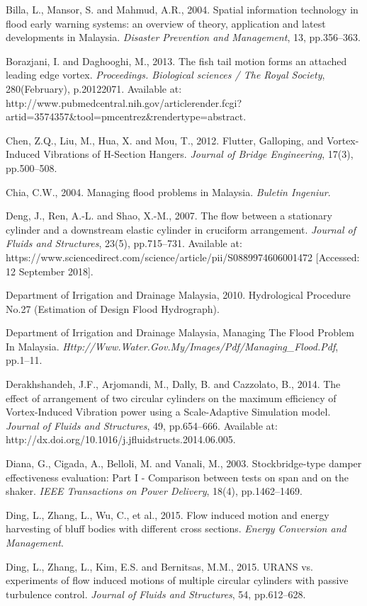 \documentclass[]{article}
\begin{document}
Billa, L., Mansor, S. and Mahmud, A.R., 2004. Spatial information
technology in flood early warning systems: an overview of theory,
application and latest developments in Malaysia. \emph{Disaster
Prevention and Management}, 13, pp.356--363.

Borazjani, I. and Daghooghi, M., 2013. The fish tail motion forms an
attached leading edge vortex. \emph{Proceedings. Biological sciences /
The Royal Society}, 280(February), p.20122071. Available at:
http://www.pubmedcentral.nih.gov/articlerender.fcgi?artid=3574357\&tool=pmcentrez\&rendertype=abstract.

Chen, Z.Q., Liu, M., Hua, X. and Mou, T., 2012. Flutter, Galloping, and
Vortex-Induced Vibrations of H-Section Hangers. \emph{Journal of Bridge
Engineering}, 17(3), pp.500--508.

Chia, C.W., 2004. Managing flood problems in Malaysia. \emph{Buletin
Ingeniur}.

Deng, J., Ren, A.-L. and Shao, X.-M., 2007. The flow between a
stationary cylinder and a downstream elastic cylinder in cruciform
arrangement. \emph{Journal of Fluids and Structures}, 23(5),
pp.715--731. Available at:
https://www.sciencedirect.com/science/article/pii/S0889974606001472
{[}Accessed: 12 September 2018{]}.

Department of Irrigation and Drainage Malaysia, 2010. Hydrological
Procedure No.27 (Estimation of Design Flood Hydrograph).

Department of Irrigation and Drainage Malaysia, Managing The Flood
Problem In Malaysia.
\emph{Http://Www.Water.Gov.My/Images/Pdf/Managing\_Flood.Pdf}, pp.1--11.

Derakhshandeh, J.F., Arjomandi, M., Dally, B. and Cazzolato, B., 2014.
The effect of arrangement of two circular cylinders on the maximum
efficiency of Vortex-Induced Vibration power using a Scale-Adaptive
Simulation model. \emph{Journal of Fluids and Structures}, 49,
pp.654--666. Available at:
http://dx.doi.org/10.1016/j.jfluidstructs.2014.06.005.

Diana, G., Cigada, A., Belloli, M. and Vanali, M., 2003.
Stockbridge-type damper effectiveness evaluation: Part I - Comparison
between tests on span and on the shaker. \emph{IEEE Transactions on
Power Delivery}, 18(4), pp.1462--1469.

Ding, L., Zhang, L., Wu, C., et al., 2015. Flow induced motion and
energy harvesting of bluff bodies with different cross sections.
\emph{Energy Conversion and Management}.

Ding, L., Zhang, L., Kim, E.S. and Bernitsas, M.M., 2015. URANS vs.
experiments of flow induced motions of multiple circular cylinders with
passive turbulence control. \emph{Journal of Fluids and Structures}, 54,
pp.612--628.
\end{document}
